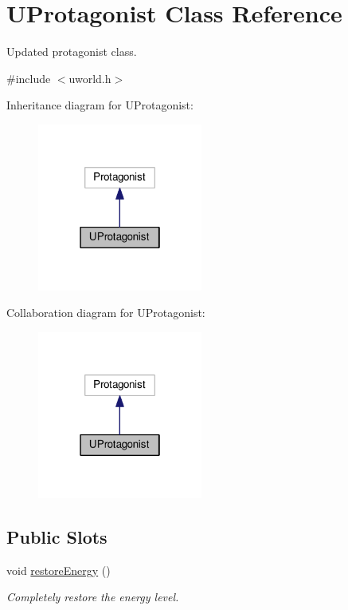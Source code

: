 \hypertarget{classUProtagonist}{}\section{U\+Protagonist Class Reference}
\label{classUProtagonist}


Updated protagonist class.  




{\ttfamily \#include $<$uworld.\+h$>$}



Inheritance diagram for U\+Protagonist\+:\nopagebreak
\begin{figure}[H]
\begin{center}
\leavevmode
\includegraphics[width=154pt]{d8/da2/classUProtagonist__inherit__graph}
\end{center}
\end{figure}


Collaboration diagram for U\+Protagonist\+:\nopagebreak
\begin{figure}[H]
\begin{center}
\leavevmode
\includegraphics[width=154pt]{df/d4d/classUProtagonist__coll__graph}
\end{center}
\end{figure}
\subsection*{Public Slots}
\begin{DoxyCompactItemize}
\item 
void \hyperlink{classUProtagonist_aafceebba330665d6c8cf6943515526d5}{restore\+Energy} ()\hypertarget{classUProtagonist_aafceebba330665d6c8cf6943515526d5}{}\label{classUProtagonist_aafceebba330665d6c8cf6943515526d5}

\begin{DoxyCompactList}\small\item\em Completely restore the energy level. \end{DoxyCompactList}\end{DoxyCompactItemize}
